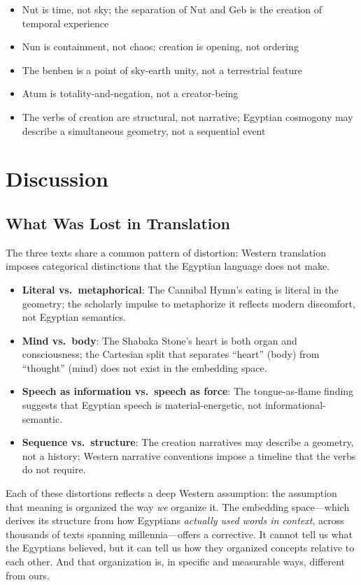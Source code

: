 \documentclass[11pt, a4paper]{article}
\begin{document}
\begin{itemize}[nosep]
    \item Nut is time, not sky; the separation of Nut and Geb is the creation of temporal experience
    \item Nun is containment, not chaos; creation is opening, not ordering
    \item The benben is a point of sky-earth unity, not a terrestrial feature
    \item Atum is totality-and-negation, not a creator-being
    \item The verbs of creation are structural, not narrative; Egyptian cosmogony may describe a simultaneous geometry, not a sequential event
\end{itemize}

\section{Discussion}
\label{sec:discussion}

\subsection{What Was Lost in Translation}

The three texts share a common pattern of distortion: Western translation imposes categorical distinctions that the Egyptian language does not make.

\begin{itemize}
    \item \textbf{Literal vs.\ metaphorical}: The Cannibal Hymn's eating is literal in the geometry; the scholarly impulse to metaphorize it reflects modern discomfort, not Egyptian semantics.
    \item \textbf{Mind vs.\ body}: The Shabaka Stone's heart is both organ and consciousness; the Cartesian split that separates ``heart'' (body) from ``thought'' (mind) does not exist in the embedding space.
    \item \textbf{Speech as information vs.\ speech as force}: The tongue-as-flame finding suggests that Egyptian speech is material-energetic, not informational-semantic.
    \item \textbf{Sequence vs.\ structure}: The creation narratives may describe a geometry, not a history; Western narrative conventions impose a timeline that the verbs do not require.
\end{itemize}

Each of these distortions reflects a deep Western assumption: the assumption that meaning is organized the way \textit{we} organize it. The embedding space---which derives its structure from how Egyptians \textit{actually used words in context}, across thousands of texts spanning millennia---offers a corrective. It cannot tell us what the Egyptians believed, but it can tell us how they organized concepts relative to each other. And that organization is, in specific and measurable ways, different from ours.
\end{document}
